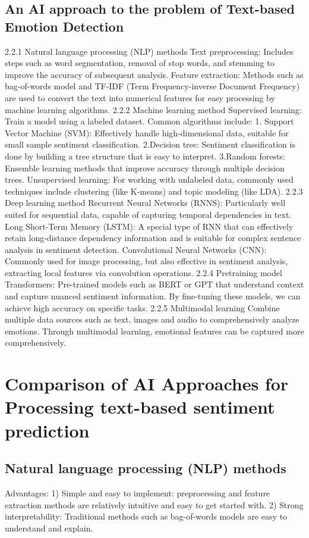 \documentclass[journal]{IEEEtran}
\begin{document}
\subsection{An AI approach to the problem of Text-based Emotion Detection}
2.2.1	Natural language processing (NLP) methods
Text preprocessing: Includes steps such as word segmentation, removal of stop words, and stemming to improve the accuracy of subsequent analysis.
Feature extraction: Methods such as bag-of-words model and TF-IDF (Term Frequency-inverse Document Frequency) are used to convert the text into numerical features for easy processing by machine learning algorithms.
2.2.2	Machine learning method
Supervised learning: Train a model using a labeled dataset. Common algorithms include:
1. Support Vector Machine (SVM): Effectively handle high-dimensional data, suitable for small sample sentiment classification.
2.Decision tree: Sentiment classification is done by building a tree structure that is easy to interpret.
3.Random forests: Ensemble learning methods that improve accuracy through multiple decision trees.
Unsupervised learning: For working with unlabeled data, commonly used techniques include clustering (like K-means) and topic modeling (like LDA). 
2.2.3	Deep learning method
Recurrent Neural Networks (RNNS): Particularly well suited for sequential data, capable of capturing temporal dependencies in text.
Long Short-Term Memory (LSTM): A special type of RNN that can effectively retain long-distance dependency information and is suitable for complex sentence analysis in sentiment detection.
Convolutional Neural Networks (CNN): Commonly used for image processing, but also effective in sentiment analysis, extracting local features via convolution operations. 
2.2.4	Pretraining model
Transformers: Pre-trained models such as BERT or GPT that understand context and capture nuanced sentiment information. By fine-tuning these models, we can achieve high accuracy on specific tasks.
2.2.5	Multimodal learning
Combine multiple data sources such as text, images and audio to comprehensively analyze emotions. Through multimodal learning, emotional features can be captured more comprehensively.
\section{Comparison of AI Approaches for Processing text-based sentiment prediction}
\subsection{Natural language processing (NLP) methods}
Advantages:
1)	Simple and easy to implement: preprocessing and feature extraction methods are relatively intuitive and easy to get started with.
2)	Strong interpretability: Traditional methods such as bag-of-words models are easy to understand and explain.
\end{document}
